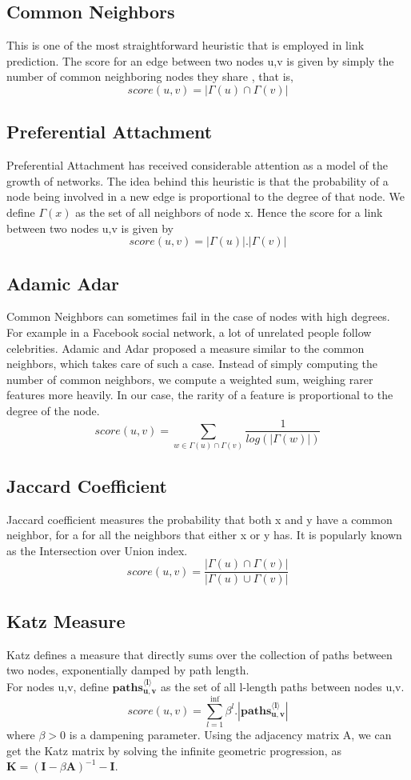 \documentclass[review]{elsarticle}
\begin{document}
\subsection{Common Neighbors}
\noindent This is one of the most straightforward heuristic that is employed in link prediction. The score for an edge between two nodes u,v is given by simply the number of common neighboring nodes they share \cite{common_neighbors}, that is,
\[score(u,v) = |\Gamma(u) \cap \Gamma(v)|\]
\subsection{Preferential Attachment}
\noindent Preferential Attachment has received considerable attention as a model of the growth of networks\cite{PA_1,PA2}. The idea behind this heuristic is that the probability of a node being involved in a new edge is proportional to the degree of that node. We define $\Gamma(x)$ as the set of all neighbors of node x. Hence the score for a link between two nodes u,v is given by 
\[score(u,v) = |\Gamma(u)|.|\Gamma(v)|\]
\subsection{Adamic Adar}
\noindent Common Neighbors can sometimes fail in the case of nodes with high degrees. For example in a Facebook social network, a lot of unrelated people follow celebrities. Adamic and Adar \cite{adamic_adar_paper} proposed a measure similar to the common neighbors, which takes care of such a case. Instead of simply computing the number of common neighbors, we compute a weighted sum, weighing rarer features more heavily. In our case, the rarity of a feature is proportional to the degree of the node.
\[score(u,v) = \sum_{w \in \Gamma(u) \cap \Gamma(v)} \frac{1}{log(|\Gamma(w)|)}\]
\subsection{Jaccard Coefficient}
\noindent Jaccard coefficient \cite{Jaccard} measures the probability that both x and y have a common neighbor, for a for all the neighbors that either x or y has. It is popularly known as the Intersection over Union index.
\[score(u,v) = \frac{|\Gamma(u) \cap \Gamma(v)|}{|\Gamma(u) \cup \Gamma(v)|}\]
\subsection{Katz Measure}
\noindent Katz \cite{katz_paper} defines a measure that directly sums over the collection of paths between two nodes, exponentially damped by path length.\\
For nodes u,v, define $\mathbf{paths^{\langle l \rangle}_{u,v}}$ as the set of all l-length paths between nodes u,v.
\[score(u,v) = \sum_{l = 1}^{\inf} \beta^l.|\mathbf{paths^{\langle l \rangle}_{u,v}}|\]
where $\beta > 0$ is a dampening parameter. Using the adjacency matrix A, we can get the Katz matrix by solving the infinite geometric progression, as $\mathbf{K} = (\mathbf{I} - \beta \mathbf{A})^{-1} - \mathbf{I}$.
\end{document}

